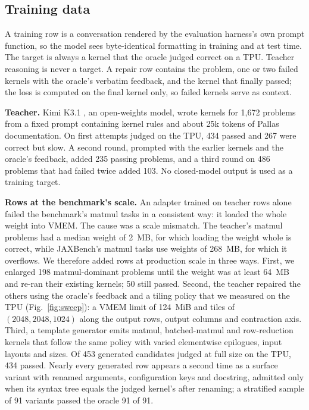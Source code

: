 \documentclass[conference]{IEEEtran}
\begin{document}
\subsection{Training data}
\label{sec:data}

A training row is a conversation rendered by the evaluation harness's own prompt function, so the model sees byte-identical
formatting in training and at test time. The target is always a kernel that the oracle judged correct on a TPU. Teacher
reasoning is never a target. A repair row contains the problem, one or two failed kernels with the oracle's verbatim feedback,
and the kernel that finally passed; the loss is computed on the final kernel only, so failed kernels serve as context.

\textbf{Teacher.} Kimi K3.1 \cite{kimi}, an open-weights model, wrote kernels for 1,672 problems from a fixed prompt
containing kernel rules and about 25k tokens of Pallas documentation. On first attempts judged on the TPU, 434 passed and 267
were correct but slow. A second round, prompted with the earlier kernels and the oracle's feedback, added 235 passing problems,
and a third round on 486 problems that had failed twice added 103. No closed-model output is used as a training target.

\textbf{Rows at the benchmark's scale.} An adapter trained on teacher rows alone failed the benchmark's matmul tasks in a
consistent way: it loaded the whole weight into VMEM. The cause was a scale mismatch. The teacher's matmul problems had a
median weight of 2~MB, for which loading the weight whole is correct, while JAXBench's matmul tasks use weights of 268~MB, for
which it overflows. We therefore added rows at production scale in three ways. First, we enlarged 198 matmul-dominant problems
until the weight was at least 64~MB and re-ran their existing kernels; 50 still passed. Second, the teacher repaired the others
using the oracle's feedback and a tiling policy that we measured on the TPU (Fig.~\ref{fig:sweep}): a VMEM limit of 124~MiB and
tiles of $(2048, 2048, 1024)$ along the output rows, output columns and contraction axis. Third, a template generator emits
matmul, batched-matmul and row-reduction kernels that follow the same policy with varied elementwise epilogues, input layouts
and sizes. Of 453 generated candidates judged at full size on the TPU, 434 passed. Nearly every generated row appears a second
time as a surface variant with renamed arguments, configuration keys and docstring, admitted only when its syntax tree equals
the judged kernel's after renaming; a stratified sample of 91 variants passed the oracle 91 of 91.
\end{document}
